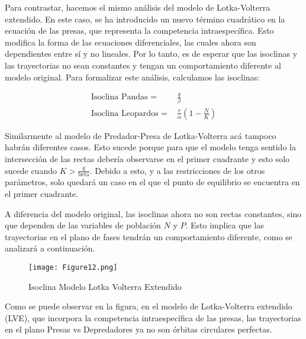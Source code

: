 \documentclass{article}
\begin{document}
\noindent Para contrastar, hacemos el mismo análisis del modelo de Lotka-Volterra extendido. En este caso, se ha introducido un nuevo término cuadrático en la ecuación de las presas, que representa la competencia intraespecífica. Esto modifica la forma de las ecuaciones diferenciales, las cuales ahora son dependientes entre sí y no lineales. Por lo tanto, es de esperar que las isoclinas y las trayectorias no sean constantes y tengan un comportamiento diferente al modelo original. Para formalizar este análisis, calculamos las isoclinas:
\vspace{0.75\baselineskip}

\begin{align*}
\text{Isoclina Pandas = } &  \frac{q}{\beta} \\
\text{Isoclina Leopardos = } & \frac{r}{\alpha}\left(1 - \frac{N}{K}\right)
\end{align*}

\noindent Similarmente al modelo de Predador-Presa de Lotka-Volterra acá tampoco habrán diferentes casos. Esto sucede porque para que el modelo tenga sentido la intersección de las rectas debería observarse en el primer cuadrante y esto solo sucede cuando $K > \frac{q}{\text{beta}}$. Debido a esto, y a las restricciones de los otros parámetros, solo quedará un caso en el que el punto de equilibrio se encuentra en el primer cuadrante.  

\vspace{1\baselineskip}
\noindent A diferencia del modelo original, las isoclinas ahora no son rectas constantes, sino que dependen de las variables de población $N$ y $P$. Esto implica que las trayectorias en el plano de fases tendrán un comportamiento diferente, como se analizará a continuación.

\vspace{1\baselineskip}



\begin{figure}[ht]
    \centering
    \caption{Isoclina Modelo Lotka Volterra Extendido}
    \texttt{[image: Figure12.png]}
    \label{fig:Image 1.1}
\end{figure}

\noindent Como se puede observar en la figura, en el modelo de Lotka-Volterra extendido (LVE), que incorpora la competencia intraespecífica de las presas, las trayectorias en el plano Presas vs Depredadores ya no son órbitas circulares perfectas. \vspace{1\baselineskip}
\end{document}
